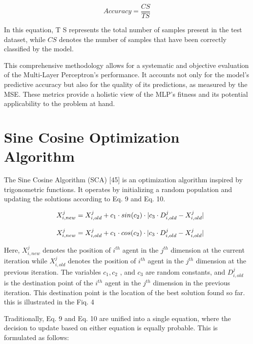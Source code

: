\begin{equation}
A c c u r a c y={\frac{C S}{T S}}
\end{equation}

In this equation, T S represents the total number of samples present in the test dataset, while $C S$ denotes the number of samples that have been correctly classified by the model.

This comprehensive methodology allows for a systematic and objective evaluation of the Multi-Layer Perceptron’s performance. It accounts not only for the model’s predictive accuracy but also for the quality of its predictions, as measured by the MSE. These metrics provide a holistic view of the MLP’s fitness and its potential applicability to the problem at hand.

\section{Sine Cosine Optimization Algorithm}

The Sine Cosine Algorithm (SCA) [45] is an optimization algorithm inspired by trigonometric functions. It operates by initializing a random population and updating the solutions according to Eq. 9 and Eq. 10.

\begin{equation}
\begin{array}{r l}&{X_{i,n e w}^{j}=X_{i,o l d}^{j}+c_{1}\cdot s i n(c_{2})\cdot|c_{3}\cdot D_{i,o l d}^{j}-X_{i,o l d}^{j}|}\\ &{}\\ &{X_{i,n e w}^{j}=X_{i,o l d}^{j}+c_{1}\cdot c o s(c_{2})\cdot|c_{3}\cdot D_{i,o l d}^{j}-X_{i,o l d}^{j}|}\end{array}
\end{equation}

Here, $X_{i,n e w}^{j}$ denotes the position of $i^{t h}$ agent in the $j^{t h}$ dimension at the current iteration while $X_{i,o l d}^{j}$ denotes the position of $i^{t h}$ agent in the $j^{t h}$ dimension at the previous iteration. The variables $c_{1},c_{2}$ , and $c_{3}$ are random constants, and $D_{i,o l d}^{j}$ is the destination point of the $i^{t h}$ agent in the $j^{t h}$ dimension in the previous iteration. This destination point is the location of the best solution found so far. this is illustrated in the Fiq. 4

Traditionally, Eq. 9 and Eq. 10 are unified into a single equation, where the decision to update based on either equation is equally probable. This is formulated as follows:

